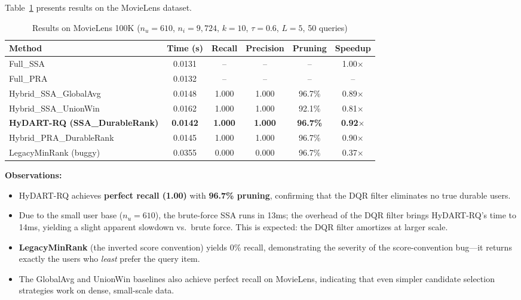 Table~\ref{tab:movielens_results} presents results on the MovieLens dataset.

\begin{table}[htbp]
\centering
\caption{Results on MovieLens 100K ($n_u=610$, $n_i=9{,}724$, $k=10$, $\tau=0.6$, $L=5$, 50 queries)}
\label{tab:movielens_results}
\begin{tabular}{lccccc}
\toprule
\textbf{Method} & \textbf{Time (s)} & \textbf{Recall} & \textbf{Precision} & \textbf{Pruning} & \textbf{Speedup} \\
\midrule
Full\_SSA           & 0.0131 & --    & --    & --     & 1.00$\times$ \\
Full\_PRA           & 0.0132 & --    & --    & --     & --  \\
Hybrid\_SSA\_GlobalAvg  & 0.0148 & 1.000 & 1.000 & 96.7\% & 0.89$\times$ \\
Hybrid\_SSA\_UnionWin   & 0.0162 & 1.000 & 1.000 & 92.1\% & 0.81$\times$ \\
\textbf{HyDART-RQ (SSA\_DurableRank)} & \textbf{0.0142} & \textbf{1.000} & \textbf{1.000} & \textbf{96.7\%} & \textbf{0.92$\times$} \\
Hybrid\_PRA\_DurableRank & 0.0145 & 1.000 & 1.000 & 96.7\% & 0.90$\times$ \\
LegacyMinRank (buggy) & 0.0355 & 0.000 & 0.000 & 96.7\% & 0.37$\times$ \\
\bottomrule
\end{tabular}
\end{table}

\textbf{Observations:}
\begin{itemize}
  \item HyDART-RQ achieves \textbf{perfect recall (1.00)} with \textbf{96.7\% pruning}, confirming that the DQR filter eliminates no true durable users.
  \item Due to the small user base ($n_u = 610$), the brute-force SSA runs in 13ms; the overhead of the DQR filter brings HyDART-RQ's time to 14ms, yielding a slight apparent slowdown vs.\ brute force. This is expected: the DQR filter amortizes at larger scale.
  \item \textbf{LegacyMinRank} (the inverted score convention) yields 0\% recall, demonstrating the severity of the score-convention bug---it returns exactly the users who \emph{least} prefer the query item.
  \item The GlobalAvg and UnionWin baselines also achieve perfect recall on MovieLens, indicating that even simpler candidate selection strategies work on dense, small-scale data.
\end{itemize}


